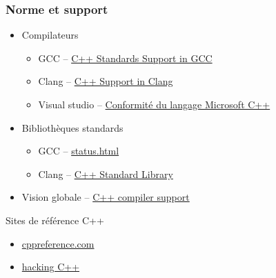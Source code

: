 \documentclass[C++.tex]{subfiles}
\begin{document}
\begin{frame}[fragile]
	\frametitle{Norme et support}
	\begin{itemize}
		\item Compilateurs
		\begin{itemize}
			\item GCC -- \href{https://gcc.gnu.org/projects/cxx-status.html}{C++ Standards Support in GCC\linklogo}
			\item Clang -- \href{http://clang.llvm.org/cxx_status.html}{C++ Support in Clang\linklogo}
			\item Visual studio -- \href{https://docs.microsoft.com/fr-fr/cpp/overview/visual-cpp-language-conformance?view=msvc-160}{Conformité du langage Microsoft C++\linklogo}
		\end{itemize}
		\item Bibliothèques standards
		\begin{itemize}
			\item GCC -- \href{https://gcc.gnu.org/onlinedocs/libstdc++/manual/status.html}{status.html\linklogo}
			\item Clang -- \href{https://libcxx.llvm.org/}{C++ Standard Library\linklogo}
		\end{itemize}
		\item Vision globale -- \href{http://en.cppreference.com/w/cpp/compiler_support}{C++ compiler support\linklogo}
	\end{itemize}

	\begin{block}{Sites de référence C++}
		\begin{itemize}
			\item \href{https://en.cppreference.com/w/}{cppreference.com\linklogo}
			\item \href{https://hackingcpp.com/}{hacking C++\linklogo}
		\end{itemize}
	\end{block}
\end{frame}
\end{document}
